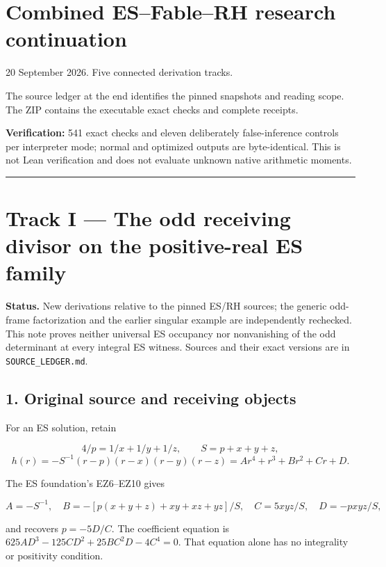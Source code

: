 \section{Combined ES--Fable--RH research
continuation}\label{combined-esfablerh-research-continuation}

20 September 2026. Five connected derivation tracks.

The source ledger at the end identifies the pinned snapshots and reading
scope. The ZIP contains the executable exact checks and complete
receipts.

\textbf{Verification:} 541 exact checks and eleven deliberately
false-inference controls per interpreter mode; normal and optimized
outputs are byte-identical. This is not Lean verification and does not
evaluate unknown native arithmetic moments.

\begin{center}\rule{0.5\linewidth}{0.5pt}\end{center}

\section{Track I --- The odd receiving divisor on the positive-real ES
family}\label{track-i-the-odd-receiving-divisor-on-the-positive-real-es-family}

\textbf{Status.} New derivations relative to the pinned ES/RH sources;
the generic odd-frame factorization and the earlier singular example are
independently rechecked. This note proves neither universal ES occupancy
nor nonvanishing of the odd determinant at every integral ES witness.
Sources and their exact versions are in \texttt{SOURCE\_LEDGER.md}.

\subsection{1. Original source and receiving
objects}\label{original-source-and-receiving-objects}

For an ES solution, retain

\[
 4/p=1/x+1/y+1/z,\qquad S=p+x+y+z,
\] \[
 h(r)=-S^{-1}(r-p)(r-x)(r-y)(r-z)=Ar^4+r^3+Br^2+Cr+D.
\]

The ES foundation's EZ6--EZ10 gives

\[
 A=-S^{-1},\quad B=-[p(x+y+z)+xy+xz+yz]/S,
 \quad C=5xyz/S,\quad D=-pxyz/S,
\]

and recovers \(p=-5D/C\). The coefficient equation is
\(625AD^3-125CD^2+25BC^2D-4C^4=0\). That equation alone has no
integrality or positivity condition.


